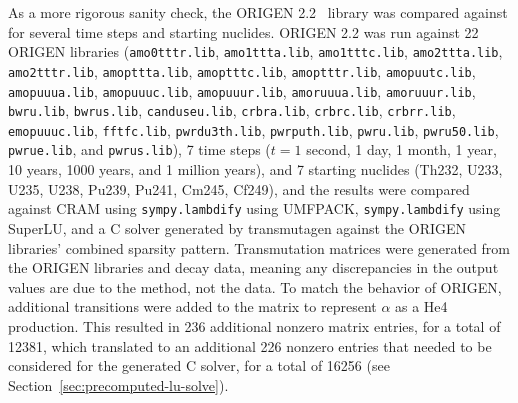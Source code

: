 As a more rigorous sanity check, the ORIGEN 2.2~\cite{ationneeded} library was
compared against for several time steps and starting nuclides. ORIGEN 2.2 was
run against 22 ORIGEN libraries (\texttt{amo0tttr.\allowbreak{}lib},
\texttt{amo1ttta.\allowbreak{}lib}, \texttt{amo1tttc.\allowbreak{}lib},
\texttt{amo2ttta.\allowbreak{}lib}, \texttt{amo2tttr.\allowbreak{}lib},
\texttt{amopttta.\allowbreak{}lib}, \texttt{amoptttc.\allowbreak{}lib},
\texttt{amoptttr.\allowbreak{}lib}, \texttt{amopuutc.\allowbreak{}lib},
\texttt{amopuuua.\allowbreak{}lib}, \texttt{amopuuuc.\allowbreak{}lib},
\texttt{amopuuur.\allowbreak{}lib}, \texttt{amoruuua.\allowbreak{}lib},
\texttt{amoruuur.\allowbreak{}lib}, \texttt{bwru.\allowbreak{}lib},
\texttt{bwrus.\allowbreak{}lib}, \texttt{canduseu.\allowbreak{}lib},
\texttt{crbra.\allowbreak{}lib}, \texttt{crbrc.\allowbreak{}lib},
\texttt{crbrr.\allowbreak{}lib}, \texttt{emopuuuc.\allowbreak{}lib},
\texttt{fftfc.\allowbreak{}lib}, \texttt{pwrdu3th.\allowbreak{}lib},
\texttt{pwrputh.\allowbreak{}lib}, \texttt{pwru.\allowbreak{}lib},
\texttt{pwru50.\allowbreak{}lib}, \texttt{pwrue.\allowbreak{}lib}, and
\texttt{pwrus.\allowbreak{}lib}), 7 time steps ($t= 1$ second, 1 day, 1 month,
1 year, 10 years, 1000 years, and 1 million years), and 7 starting nuclides
(Th232, U233, U235, U238, Pu239, Pu241, Cm245, Cf249), and the results were
compared against CRAM using \texttt{sympy.\allowbreak{}lambdify} using
UMFPACK, \texttt{sympy.\allowbreak{}lambdify} using SuperLU, and a C solver
generated by transmutagen against the ORIGEN libraries' combined sparsity
pattern. Transmutation matrices were generated from the ORIGEN libraries and
decay data, meaning any discrepancies in the output values are due to the
method, not the data. To match the behavior of ORIGEN, additional transitions
were added to the matrix to represent $\alpha$ as a He4 production. This
resulted in 236 additional nonzero matrix entries, for a total of 12381, which
translated to an additional 226 nonzero entries that needed to be considered
for the generated C solver, for a total of 16256 (see
Section~\ref{sec:precomputed-lu-solve}). 

